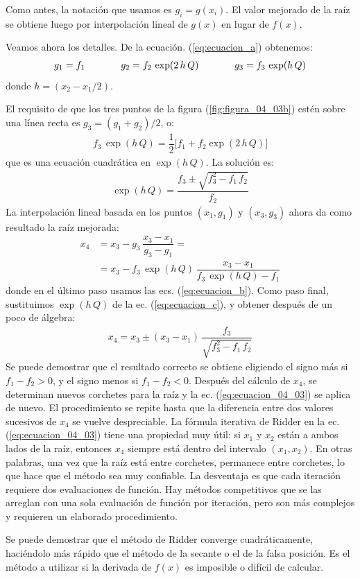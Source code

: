 Como antes, la notación que usamos es $g_{i} = g (x_{i})$. El valor mejorado de la raíz se obtiene luego por interpolación lineal de $g (x)$ en lugar de $f (x)$.
\par
Veamos ahora los detalles. De la ecuación. (\ref{eq:ecuacion_a}) obtenemos:
\begin{align}
g_{1} = f_{1} \hspace{1.3cm} g_{2} = f_{2} \, \exp(2 \, h \, Q) \hspace{1.3cm} g_{3} = f_{3} \, \exp(h \, Q)
\label{eq:ecuacion_b}
\end{align}
donde $h = (x_{2} - x_{1}/2)$.
\par
El requisito de que los tres puntos de la figura (\ref{fig:figura_04_03b}) estén sobre una línea recta es $g_{3} = ( g_{1} + g_{2})/2$, o:
\begin{align*}
f_{3} \, \exp(h \, Q) = \dfrac{1}{2} \bigg[ f_{1} + f_{2} \exp(2 \, h \, Q) \bigg]
\end{align*}
que es una ecuación cuadrática en $\exp(h \, Q)$. La solución es:
\begin{align}
\exp(h \, Q) = \dfrac{f_{3} \pm \sqrt{f_{3}^{2} - f_{1} \, f_{2}}}{f_{2}}
\label{eq:ecuacion_c}
\end{align}
La interpolación lineal basada en los puntos $(x_{1}, g_{1})$ y $(x_{3}, g_{3})$ ahora da como resultado la raíz mejorada:
\begin{align*}
x_{4} &= x_{3} - g_{3} \, \dfrac{x_{3} - x_{1}}{g_{3} - g_{1}} = \\
&= x_{3} - f_{3} \, \exp(h \, Q) \, \dfrac{x_{3} - x_{1}}{f_{3} \, \exp(h \, Q) - f_{1}}
\end{align*}
donde en el último paso usamos las ecs. (\ref{eq:ecuacion_b}). Como paso final, sustituimos $\exp(h \, Q)$ de la ec. (\ref{eq:ecuacion_c}), y obtener después de un poco de álgebra:
\begin{align}
x_{4} = x_{3} \pm (x_{3} - x_{1}) \, \dfrac{f_{3}}{\sqrt{f_{3}^{2} - f_{1} \, f_{2}}}
\label{eq:ecuacion_04_03}
\end{align}
Se puede demostrar que el resultado correcto se obtiene eligiendo el signo más si $f_{1} - f_{2} > 0$, y el signo menos si $f_{1} - f_{2} < 0$. Después del cálculo de $x_{4}$, se determinan nuevos corchetes para la raíz y la ec. (\ref{eq:ecuacion_04_03}) se aplica de nuevo. El procedimiento se repite hasta que la diferencia entre dos valores sucesivos de $x_{4}$ se vuelve despreciable. La fórmula iterativa de Ridder en la ec. (\ref{eq:ecuacion_04_03}) tiene una propiedad muy útil: si $x_{1}$ y $x_{2}$ están a ambos lados de la raíz, entonces $x_{4}$ siempre está dentro del intervalo $(x_{1}, x_{2})$. En otras palabras, una vez que la raíz está entre corchetes, permanece entre corchetes, lo que hace que el método sea muy confiable. La desventaja es que cada iteración requiere dos evaluaciones de función. Hay métodos competitivos que se las arreglan con una sola evaluación de función por iteración, pero son más complejos y requieren un elaborado procedimiento.
\par
Se puede demostrar que el método de Ridder converge cuadráticamente, haciéndolo más rápido que el método de la secante o el de la falsa posición. Es el método a utilizar si la derivada de $f (x)$ es imposible o difícil de calcular.

